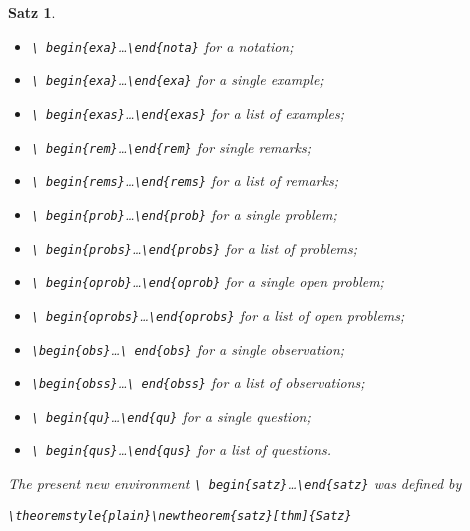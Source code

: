 \documentclass{jpc} %
\theoremstyle{plain}\newtheorem{satz}[thm]{Satz} %
\begin{document}
\begin{satz}
\begin{itemize}
\begin{itemize}
\item\emph{\texttt{\textbackslash
    begin\{exa\}}\dots\texttt{\textbackslash end\{nota\}}} for a notation;
\item\emph{\texttt{\textbackslash
    begin\{exa\}}\dots\texttt{\textbackslash end\{exa\}}} for a single example;
\item\emph{\texttt{\textbackslash
    begin\{exas\}}\dots\texttt{\textbackslash end\{exas\}}} for a list of examples;
\item\emph{\texttt{\textbackslash
    begin\{rem\}}\dots\texttt{\textbackslash end\{rem\}}} for single remarks;
\item\emph{\texttt{\textbackslash
    begin\{rems\}}\dots\texttt{\textbackslash end\{rems\}}} for a list of remarks;
\item\emph{\texttt{\textbackslash
    begin\{prob\}}\dots\texttt{\textbackslash end\{prob\}}} for a
  single problem;
\item\emph{\texttt{\textbackslash
  begin\{probs\}}\dots\texttt{\textbackslash end\{probs\}}} for a list
  of problems;
\item\emph{\texttt{\textbackslash
    begin\{oprob\}}\dots\texttt{\textbackslash end\{oprob\}}} for a single open problem;
\item\emph{\texttt{\textbackslash
    begin\{oprobs\}}\dots\texttt{\textbackslash end\{oprobs\}}} for a
  list of open problems;
\item\emph{\texttt{\textbackslash begin\{obs\}}\dots\texttt{\textbackslash
  end\{obs\}}} for a single observation;
\item\emph{\texttt{\textbackslash begin\{obss\}}\dots\texttt{\textbackslash
  end\{obss\}}} for a list of observations;
\item\emph{\texttt{\textbackslash
    begin\{qu\}}\dots\texttt{\textbackslash end\{qu\}}} for a single question;
\item\emph{\texttt{\textbackslash
    begin\{qus\}}\dots\texttt{\textbackslash end\{qus\}}} for a list of questions.
\end{itemize}
\end{itemize}
  The present new environment \emph{\texttt{\textbackslash
    begin\{satz\}}\dots\texttt{\textbackslash end\{satz\}}} was defined
  by
\begin{center}
  \emph{\texttt{\textbackslash theoremstyle\{plain\}\textbackslash newtheorem\{satz\}[thm]\{Satz\}}}
\end{center}
\end{satz}
\end{document}
